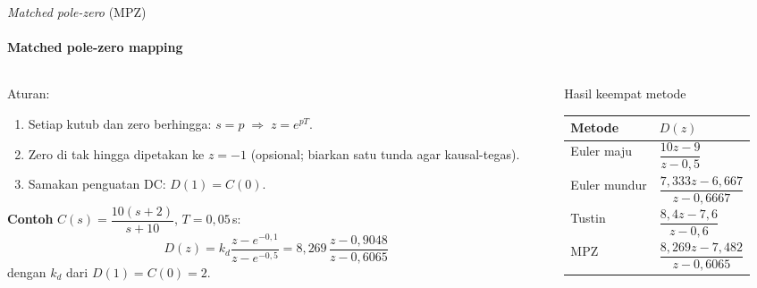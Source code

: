 \documentclass[aspectratio=169,10pt]{beamer}
\begin{document}
\begin{frame}{\textit{Matched pole-zero} (MPZ)}
	\framesubtitle{Matched pole-zero mapping}
	\begin{columns}[T]
		\begin{column}{0.52\textwidth}
			\small
			Aturan:
			\begin{enumerate}
				\item Setiap kutub dan zero berhingga: $s=p \;\Rightarrow\; z = e^{pT}$.
				\item Zero di tak hingga dipetakan ke $z=-1$ (opsional; biarkan satu tunda agar kausal-tegas).
				\item Samakan penguatan DC: $D(1) = C(0)$.
			\end{enumerate}
			\vspace{0.15cm}
			\textbf{Contoh} $C(s)=\dfrac{10(s+2)}{s+10}$, $T=0{,}05$\,s:
			\[
				D(z) = k_d\frac{z - e^{-0{,}1}}{z - e^{-0{,}5}} = 8{,}269\,\frac{z-0{,}9048}{z-0{,}6065}
			\]
			dengan $k_d$ dari $D(1) = C(0) = 2$.
		\end{column}
		\begin{column}{0.44\textwidth}
			\begin{block}{Hasil keempat metode}
				\scriptsize
				\renewcommand{\arraystretch}{2.5}
				\begin{tabular}{@{}l l@{}}
					\toprule
					Metode & $D(z)$ \\
					\midrule
					Euler maju & $\dfrac{10z - 9}{z - 0{,}5}$ \\
					Euler mundur & $\dfrac{7{,}333z - 6{,}667}{z - 0{,}6667}$ \\
					Tustin & $\dfrac{8{,}4z - 7{,}6}{z - 0{,}6}$ \\
					MPZ & $\dfrac{8{,}269z - 7{,}482}{z - 0{,}6065}$ \\
					\bottomrule
				\end{tabular}
			\end{block}
		\end{column}
	\end{columns}
\end{frame}
\end{document}
